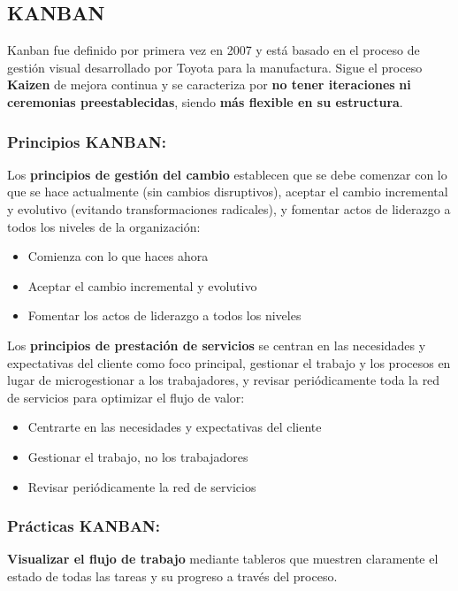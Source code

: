 \documentclass[a4paper,11pt]{report}
\begin{document}
\subsection{KANBAN}

Kanban fue definido por primera vez en 2007 y está basado en el proceso de gestión visual desarrollado por Toyota para la manufactura. Sigue el proceso \textbf{Kaizen} de mejora continua y se caracteriza por \textbf{no tener iteraciones} \textbf{ni ceremonias preestablecidas}, siendo \textbf{más flexible en su estructura}.

\subsubsection{Principios KANBAN:}

Los \textbf{principios de gestión del cambio} establecen que se debe comenzar con lo que se hace actualmente (sin cambios disruptivos), aceptar el cambio incremental y evolutivo (evitando transformaciones radicales), y fomentar actos de liderazgo a todos los niveles de la organización:
\begin{itemize}
    \item Comienza con lo que haces ahora
    \item Aceptar el cambio incremental y evolutivo
    \item Fomentar los actos de liderazgo a todos los niveles
\end{itemize}

Los \textbf{principios de prestación de servicios} se centran en las necesidades y expectativas del cliente como foco principal, gestionar el trabajo y los procesos en lugar de microgestionar a los trabajadores, y revisar periódicamente toda la red de servicios para optimizar el flujo de valor:
\begin{itemize}
    \item Centrarte en las necesidades y expectativas del cliente
    \item  Gestionar el trabajo, no los trabajadores
    \item Revisar periódicamente la red de servicios
\end{itemize}

\subsubsection{Prácticas KANBAN:}

\textbf{Visualizar el flujo de trabajo} mediante tableros que muestren claramente el estado de todas las tareas y su progreso a través del proceso.
\end{document}
